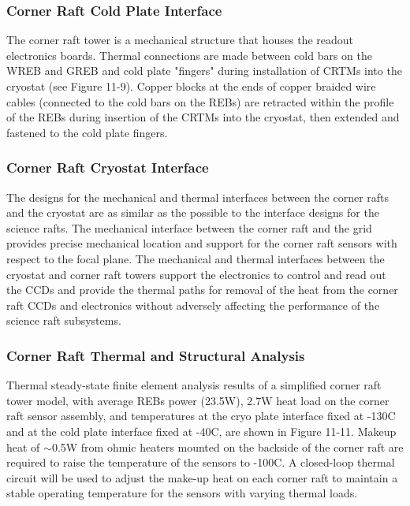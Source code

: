 \subsubsection{Corner Raft Cold Plate Interface}

The corner raft tower is a mechanical structure that houses the readout electronics boards. Thermal
connections are made between cold bars on the WREB and GREB and cold plate "fingers" during
installation of CRTMs into the cryostat (see Figure 11-9). Copper blocks at the ends of copper braided
wire cables (connected to the cold bars on the REBs) are retracted within the profile of the REBs during
insertion of the CRTMs into the cryostat, then extended and fastened to the cold plate fingers.

\subsubsection{Corner Raft Cryostat Interface} 
The designs for the mechanical and thermal interfaces between the corner rafts and the cryostat are as
similar as the possible to the interface designs for the science rafts. The mechanical interface between
the corner raft and the grid provides precise mechanical location and support for the corner raft sensors
with respect to the focal plane. The mechanical and thermal interfaces between the cryostat and corner
raft towers support the electronics to control and read out the CCDs and provide the thermal paths for
removal of the heat from the corner raft CCDs and electronics without adversely affecting the
performance of the science raft subsystems.

\subsubsection{Corner Raft Thermal and Structural Analysis}

Thermal steady-state finite element analysis results of a simplified corner raft tower model, with
average REBs power (23.5W), 2.7W heat load on the corner raft sensor assembly, and temperatures at
the cryo plate interface fixed at -130C and at the cold plate interface fixed at -40C, are shown in Figure
11-11. Makeup heat of $\sim$0.5W from ohmic heaters mounted on the backside of the corner raft are
required to raise the temperature of the sensors to -100C. A closed-loop thermal circuit will be used to
adjust the make-up heat on each corner raft to maintain a stable operating temperature for the sensors
with varying thermal loads.


